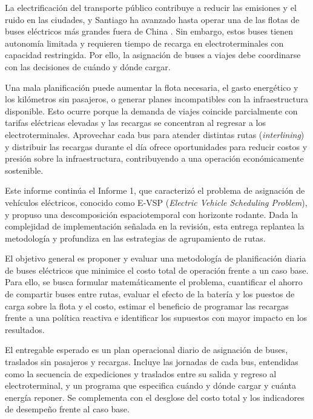 La electrificación del transporte público contribuye a reducir las emisiones y el ruido en las ciudades, y Santiago ha avanzado hasta operar una de las flotas de buses eléctricos más grandes fuera de China \cite{worldbank2020chile}. Sin embargo, estos buses tienen autonomía limitada y requieren tiempo de recarga en electroterminales con capacidad restringida. Por ello, la asignación de buses a viajes debe coordinarse con las decisiones de cuándo y dónde cargar.

Una mala planificación puede aumentar la flota necesaria, el gasto energético y los kilómetros sin pasajeros, o generar planes incompatibles con la infraestructura disponible. Esto ocurre porque la demanda de viajes coincide parcialmente con tarifas eléctricas elevadas y las recargas se concentran al regresar a los electroterminales. Aprovechar cada bus para atender distintas rutas (\textit{interlining}) y distribuir las recargas durante el día ofrece oportunidades para reducir costos y presión sobre la infraestructura, contribuyendo a una operación económicamente sostenible.

Este informe continúa el Informe 1, que caracterizó el problema de asignación de vehículos eléctricos, conocido como E-VSP (\textit{Electric Vehicle Scheduling Problem}), y propuso una descomposición espaciotemporal con horizonte rodante. Dada la complejidad de implementación señalada en la revisión, esta entrega replantea la metodología y profundiza en las estrategias de agrupamiento de rutas.

El objetivo general es proponer y evaluar una metodología de planificación diaria de buses eléctricos que minimice el costo total de operación frente a un caso base. Para ello, se busca formular matemáticamente el problema, cuantificar el ahorro de compartir buses entre rutas, evaluar el efecto de la batería y los puestos de carga sobre la flota y el costo, estimar el beneficio de programar las recargas frente a una política reactiva e identificar los supuestos con mayor impacto en los resultados.

El entregable esperado es un plan operacional diario de asignación de buses, traslados sin pasajeros y recargas. Incluye las jornadas de cada bus, entendidas como la secuencia de expediciones y traslados entre su salida y regreso al electroterminal, y un programa que especifica cuándo y dónde cargar y cuánta energía reponer. Se complementa con el desglose del costo total y los indicadores de desempeño frente al caso base.

